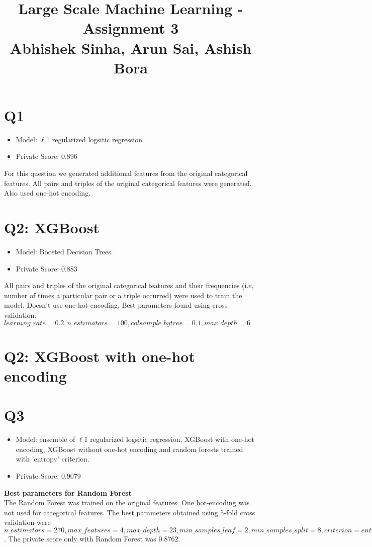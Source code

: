 \documentclass{article}
\begin{document}
\title{Large Scale Machine Learning - Assignment 3\\Abhishek Sinha, Arun Sai, Ashish Bora}
\maketitle
\section{Q1}
\begin{itemize}
\item Model:  $\ell$1 regularized logsitic regression
\item Private Score: 0.896
\end{itemize}

For this question we generated additional features from the original categorical features. All pairs and triples of the original categorical features were generated. Also used one-hot encoding.
\section{Q2: XGBoost}
\begin{itemize}
\item Model:  Boosted Decision Trees. 
\item Private Score: 0.883
\end{itemize}

All pairs and triples of the original categorical features and their frequencies (i.e, number of times a particular pair or a triple occurred) were used to train the model. Doesn't use one-hot encoding. Best parameters found using cross validation: $learning\_rate =0.2, n\_estimators=100, colsample\_bytree = 0.1, max\_depth=6$


\section{Q2: XGBoost with one-hot encoding}
\section{Q3}
\begin{itemize}
\item Model:  ensemble of $\ell$1 regularized logsitic regression, XGBoost with one-hot encoding, XGBoost without one-hot encoding and random forests trained with 'entropy' criterion.
\item Private Score: 0.9079
\end{itemize}
\textbf{Best parameters for Random Forest}\\
The Random Forest was trained on the original features. One hot-encoding was not used for categorical features. The best parameters obtained using 5-fold cross validation were-- $n\_estimators= 270, max\_features=4, max\_depth=23, min\_samples\_leaf=2,min\_samples\_split=8, criterion=entropy$. The private score only with Random Forest was 0.8762.
\end{document}

